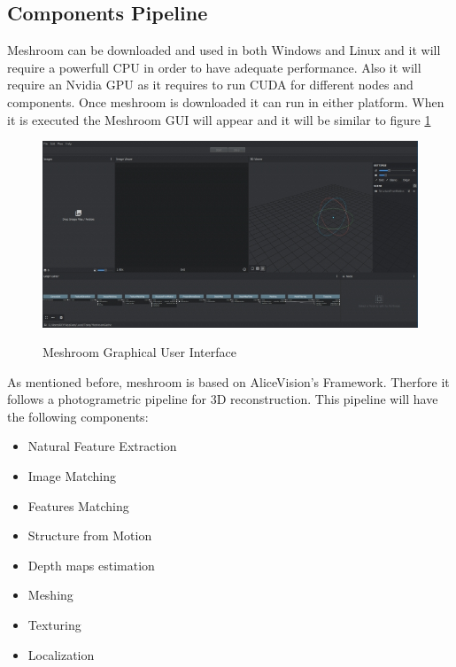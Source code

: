 \documentclass[12pt]{report}
\begin{document}
\subsection*{Components Pipeline}
Meshroom can be downloaded and used in both Windows and Linux and it will require a powerfull CPU in order to have adequate performance. Also it will require an Nvidia GPU as it requires to run CUDA for different nodes and components.
Once meshroom is downloaded it can run in either platform. When it is executed the Meshroom GUI will appear and it will be similar to figure \ref{fig:meshroom_gui}

\begin{figure}[h]
  \centering
  \includegraphics[width=1\textwidth]{meshroom_gui.jpg}
  \caption{Meshroom Graphical User Interface}\cite[]{meshroom}
  \label{fig:meshroom_gui} 
\end{figure}

\newpage
As mentioned before, meshroom is based on AliceVision's Framework. Therfore it follows a photogrametric pipeline for 3D reconstruction. 
This pipeline will have the following components:
\begin{itemize}
  \item Natural Feature Extraction
  \item Image Matching
  \item Features Matching
  \item Structure from Motion
  \item Depth maps estimation
  \item Meshing
  \item Texturing
  \item Localization
\end{itemize}
\end{document}
